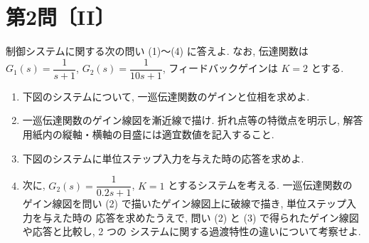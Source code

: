 
\section*{第2問〔II〕}

制御システムに関する次の問い (1)〜(4) に答えよ. なお, 伝達関数は $G_1(s)=\dfrac{1}{s+1}$,
$G_2(s)=\dfrac{1}{10s+1}$, フィードバックゲインは $K=2$ とする.

\begin{center}
\end{center}

\begin{enumerate}[label=(\arabic*)]
  \item 下図のシステムについて, 一巡伝達関数のゲインと位相を求めよ.

  \item 一巡伝達関数のゲイン線図を漸近線で描け. 折れ点等の特徴点を明示し,
        解答用紙内の縦軸・横軸の目盛には適宜数値を記入すること.

  \item 下図のシステムに単位ステップ入力を与えた時の応答を求めよ.

  \item 次に, $G_2(s)=\dfrac{1}{0.2s+1}$, $K=1$ とするシステムを考える. 一巡伝達関数の
        ゲイン線図を問い (2) で描いたゲイン線図上に破線で描き, 単位ステップ入力を与えた時の
        応答を求めたうえで, 問い (2) と (3) で得られたゲイン線図や応答と比較し, 2 つの
        システムに関する過渡特性の違いについて考察せよ.
\end{enumerate}
